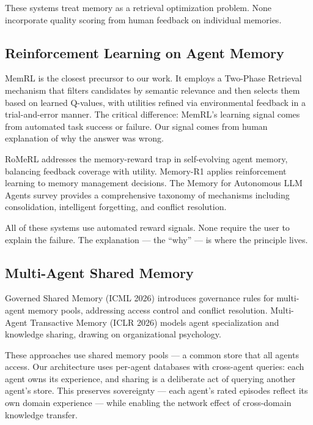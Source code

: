 \documentclass[11pt,a4paper]{article}
\begin{document}
These systems treat memory as a retrieval optimization problem. None incorporate quality scoring from human feedback on individual memories.

\subsection{Reinforcement Learning on Agent Memory}

MemRL \cite{memrl} is the closest precursor to our work. It employs a Two-Phase Retrieval mechanism that filters candidates by semantic relevance and then selects them based on learned Q-values, with utilities refined via environmental feedback in a trial-and-error manner. The critical difference: MemRL's learning signal comes from automated task success or failure. Our signal comes from human explanation of why the answer was wrong.

RoMeRL \cite{romerl} addresses the memory-reward trap in self-evolving agent memory, balancing feedback coverage with utility. Memory-R1 \cite{memoryr1} applies reinforcement learning to memory management decisions. The Memory for Autonomous LLM Agents survey \cite{memsurvey} provides a comprehensive taxonomy of mechanisms including consolidation, intelligent forgetting, and conflict resolution.

All of these systems use automated reward signals. None require the user to explain the failure. The explanation --- the ``why'' --- is where the principle lives.

\subsection{Multi-Agent Shared Memory}

Governed Shared Memory \cite{govmem} (ICML 2026) introduces governance rules for multi-agent memory pools, addressing access control and conflict resolution. Multi-Agent Transactive Memory \cite{transactive} (ICLR 2026) models agent specialization and knowledge sharing, drawing on organizational psychology.

These approaches use shared memory pools --- a common store that all agents access. Our architecture uses per-agent databases with cross-agent queries: each agent owns its experience, and sharing is a deliberate act of querying another agent's store. This preserves sovereignty --- each agent's rated episodes reflect its own domain experience --- while enabling the network effect of cross-domain knowledge transfer.
\end{document}
